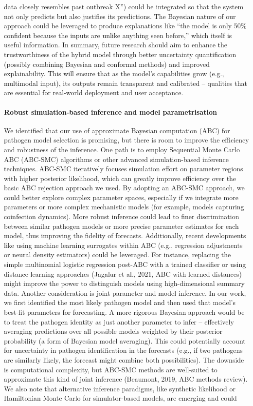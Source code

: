 data closely resembles past outbreak X”) could be integrated so that the system not only predicts but also justifies its predictions. The Bayesian nature of our approach could be leveraged to produce explanations like “the model is only 50\% confident because the inputs are unlike anything seen before,” which itself is useful information. In summary, future research should aim to enhance the trustworthiness of the hybrid model through better uncertainty quantification (possibly combining Bayesian and conformal methods) and improved explainability. This will ensure that as the model’s capabilities grow (e.g., multimodal input), its outputs remain transparent and calibrated – qualities that are essential for real-world deployment and user acceptance.

\paragraph{Robust simulation-based inference and model parametrisation} We identified that our use of approximate Bayesian computation (ABC) for pathogen model selection is promising, but there is room to improve the efficiency and robustness of the inference. One path is to employ Sequential Monte Carlo ABC (ABC-SMC) algorithms or other advanced simulation-based inference techniques. ABC-SMC iteratively focuses simulation effort on parameter regions with higher posterior likelihood, which can greatly improve efficiency over the basic ABC rejection approach we used. By adopting an ABC-SMC approach, we could better explore complex parameter spaces, especially if we integrate more parameters or more complex mechanistic models (for example, models capturing coinfection dynamics). More robust inference could lead to finer discrimination between similar pathogen models or more precise parameter estimates for each model, thus improving the fidelity of forecasts. Additionally, recent developments like using machine learning surrogates within ABC (e.g., regression adjustments or neural density estimators) could be leveraged. For instance, replacing the simple multinomial logistic regression post-ABC with a trained classifier or using distance-learning approaches (Jagalur et al., 2021, ABC with learned distances) might improve the power to distinguish models using high-dimensional summary data. Another consideration is joint parameter and model inference. In our work, we first identified the most likely pathogen model and then used that model’s best-fit parameters for forecasting. A more rigorous Bayesian approach would be to treat the pathogen identity as just another parameter to infer – effectively averaging predictions over all possible models weighted by their posterior probability (a form of Bayesian model averaging). This could potentially account for uncertainty in pathogen identification in the forecasts (e.g., if two pathogens are similarly likely, the forecast might combine both possibilities). The downside is computational complexity, but ABC-SMC methods are well-suited to approximate this kind of joint inference (Beaumont, 2019, ABC methods review). We also note that alternative inference paradigms, like synthetic likelihood or Hamiltonian Monte Carlo for simulator-based models, are emerging and could 